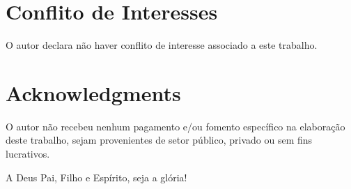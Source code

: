 
\section*{Conflito de Interesses}

    O autor declara não haver conflito de interesse associado a este trabalho.



\section*{Acknowledgments}

    O autor não recebeu nenhum pagamento e/ou fomento específico na elaboração  deste  trabalho,  sejam  provenientes  de  setor
    público, privado ou sem fins lucrativos.

    A \YA{} Deus Pai, Filho e Espírito, seja a glória!




